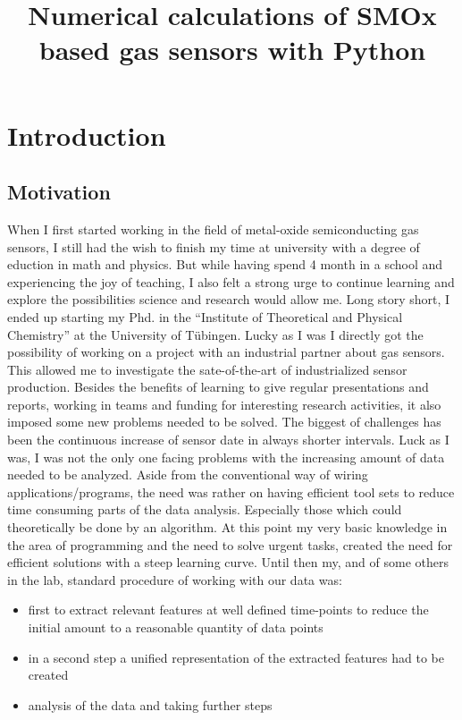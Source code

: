 \documentclass[11pt]{article}
\title{Numerical calculations of SMOx based gas sensors with Python}
\providecommand{\tightlist}{%
      \setlength{\itemsep}{0pt}\setlength{\parskip}{0pt}}
\begin{document}
    
    \maketitle
    
    

    
    \tableofcontents 
\setcounter{section}{0}

    \hypertarget{introduction}{%
\section{Introduction}\label{introduction}}

\hypertarget{motivation}{%
\subsection{Motivation}\label{motivation}}

When I first started working in the field of metal-oxide semiconducting
gas sensors, I still had the wish to finish my time at university with a
degree of eduction in math and physics. But while having spend 4 month
in a school and experiencing the joy of teaching, I also felt a strong
urge to continue learning and explore the possibilities science and
research would allow me. Long story short, I ended up starting my Phd.
in the ``Institute of Theoretical and Physical Chemistry'' at the
University of Tübingen. Lucky as I was I directly got the possibility of
working on a project with an industrial partner about gas sensors. This
allowed me to investigate the sate-of-the-art of industrialized sensor
production. Besides the benefits of learning to give regular
presentations and reports, working in teams and funding for interesting
research activities, it also imposed some new problems needed to be
solved. The biggest of challenges has been the continuous increase of
sensor date in always shorter intervals. Luck as I was, I was not the
only one facing problems with the increasing amount of data needed to be
analyzed. Aside from the conventional way of wiring
applications/programs, the need was rather on having efficient tool sets
to reduce time consuming parts of the data analysis. Especially those
which could theoretically be done by an algorithm. At this point my very
basic knowledge in the area of programming and the need to solve urgent
tasks, created the need for efficient solutions with a steep learning
curve. Until then my, and of some others in the lab, standard procedure
of working with our data was:

\begin{itemize}
\tightlist
\item
  first to extract relevant features at well defined time-points to
  reduce the initial amount to a reasonable quantity of data points
\item
  in a second step a unified representation of the extracted features
  had to be created
\item
  analysis of the data and taking further steps
\end{itemize}
\end{document}
